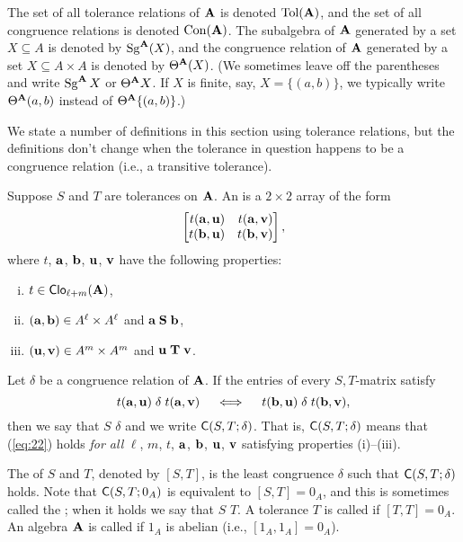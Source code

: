 The set of all tolerance relations of $\mathbf{A}$ is denoted $\operatorname{Tol}(\mathbf{A})$,
and the set of all congruence relations is denoted $\operatorname{Con}(\mathbf{A})$.
The subalgebra of $\mathbf{A}$ generated by a set $X \subseteq A$ is denoted by
$\operatorname{Sg}^{\mathbf{A}}(X)$, and
the congruence relation of $\mathbf{A}$ generated by a set $X \subseteq A\times A$ is
denoted by $\Theta^{\mathbf{A}}(X)$.
(We sometimes leave off the parentheses and write $\operatorname{Sg}^{\mathbf{A}}X$ or $\Theta^{\mathbf{A}}X$.
If $X$ is finite, say, $X = \{(a,b)\}$, we typically write
$\Theta^{\mathbf{A}}(a,b)$ instead of $\Theta^{\mathbf{A}}\{(a,b)\}$.)


We state a number of definitions in this section using tolerance relations, but
the definitions don't change when the tolerance in question happens to be
a congruence relation (i.e., a transitive tolerance).

Suppose $S$ and $T$ are tolerances on $\mathbf{A}$.  An 
is a $2\times 2$ array of the form
\[
\begin{bmatrix*}[r] t(\ba,\bu) & t(\ba,\bv)\\ t(\bb,\bu)&t(\bb,\bv)\end{bmatrix*},
\]
where $t$, $\mathbf{a}$, $\mathbf{b}$, $\mathbf{u}$, $\mathbf{v}$ have the following properties:
\begin{enumerate}[(i)] %
\item $t\in \operatorname{\mathsf{Clo}}_{\ell + m}(\mathbf{A})$,
\item $(\mathbf{a}, \mathbf{b})\in A^\ell\times A^\ell$ and $\mathbf{a} \mathrel{\mathbf{S}} \mathbf{b}$,
\item $(\mathbf{u}, \mathbf{v})\in A^m\times A^m$ and $\mathbf{u} \mathrel{\mathbf{T}} \mathbf{v}$.
\end{enumerate}
Let $\delta$ be a congruence relation of $\mathbf{A}$.
If the entries of every $S,T$-matrix satisfy
\begin{equation}
  \label{eq:22}
t(\mathbf{a},\mathbf{u}) \mathrel{\delta} t(\mathbf{a},\mathbf{v})\quad \iff \quad t(\mathbf{b},\mathbf{u}) \mathrel{\delta} t(\mathbf{b},\mathbf{v}),
\end{equation}
then we say that $S$  $\delta$ and we write
$\mathsf{C}(S, T; \delta)$.
That is, $\mathsf{C}(S, T; \delta)$  means that
(\ref{eq:22}) holds \emph{for all}
$\ell$, $m$, $t$, $\mathbf{a}$, $\mathbf{b}$, $\mathbf{u}$, $\mathbf{v}$ satisfying properties (i)--(iii).

The  of $S$ and $T$, denoted by $[S, T]$,
is the least congruence $\delta$ such that $\mathsf{C}(S, T; \delta)$
holds.
Note that $\mathsf{C}(S, T; 0_A)$ is equivalent to $[S,T] = 0_A$, and this
is sometimes called the ;
when it holds we say  that
$S$  $T$. %
A tolerance $T$ is called  if
$[T, T] = 0_A$.
An algebra $\mathbf{A}$ is called  if $1_A$ is abelian
(i.e., $[1_A,1_A] = 0_A$).

